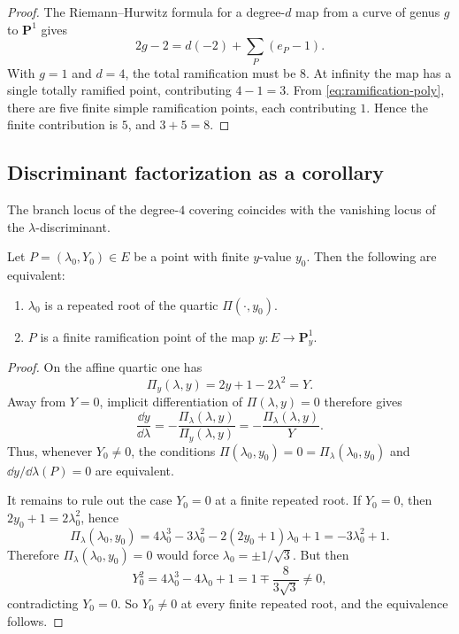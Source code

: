 \begin{proof}
The Riemann--Hurwitz formula for a degree-\(d\) map from a curve of genus \(g\) to \(\mathbf P^1\) gives
\[
2g-2=d(-2)+\sum_P(e_P-1).
\]
With \(g=1\) and \(d=4\), the total ramification must be \(8\).
At infinity the map has a single totally ramified point, contributing \(4-1=3\).
From \eqref{eq:ramification-poly}, there are five finite simple ramification points, each contributing \(1\).
Hence the finite contribution is \(5\), and \(3+5=8\).
\end{proof}

\subsection{Discriminant factorization as a corollary}\label{subsec:disc-corollary}

The branch locus of the degree-\(4\) covering coincides with the vanishing locus of the \(\lambda\)-discriminant.

\begin{lemma}\label{lem:repeated-root-ramification}
Let \(P=(\lambda_0,Y_0)\in E\) be a point with finite \(y\)-value \(y_0\).
Then the following are equivalent:
\begin{enumerate}
\item \(\lambda_0\) is a repeated root of the quartic \(\Pi(\cdot,y_0)\).
\item \(P\) is a finite ramification point of the map \(y:E\to \mathbf P^1_y\).
\end{enumerate}
\end{lemma}

\begin{proof}
On the affine quartic one has
\begin{equation}\label{eq:Pi-y-equals-Y}
\Pi_y(\lambda,y)=2y+1-2\lambda^2=Y.
\end{equation}
Away from \(Y=0\), implicit differentiation of \(\Pi(\lambda,y)=0\) therefore gives
\[
\frac{\dd y}{\dd\lambda}
=
-\frac{\Pi_\lambda(\lambda,y)}{\Pi_y(\lambda,y)}
=
-\frac{\Pi_\lambda(\lambda,y)}{Y}.
\]
Thus, whenever \(Y_0\neq 0\), the conditions \(\Pi(\lambda_0,y_0)=0=\Pi_\lambda(\lambda_0,y_0)\) and \(\dd y/\dd\lambda(P)=0\) are equivalent.

It remains to rule out the case \(Y_0=0\) at a finite repeated root.
If \(Y_0=0\), then \(2y_0+1=2\lambda_0^2\), hence
\[
\Pi_\lambda(\lambda_0,y_0)
=
4\lambda_0^3-3\lambda_0^2-2(2y_0+1)\lambda_0+1
=
-3\lambda_0^2+1.
\]
Therefore \(\Pi_\lambda(\lambda_0,y_0)=0\) would force \(\lambda_0=\pm 1/\sqrt3\).
But then
\[
Y_0^2=4\lambda_0^3-4\lambda_0+1
=
1\mp \frac{8}{3\sqrt3}\neq 0,
\]
contradicting \(Y_0=0\).
So \(Y_0\neq 0\) at every finite repeated root, and the equivalence follows.
\end{proof}

